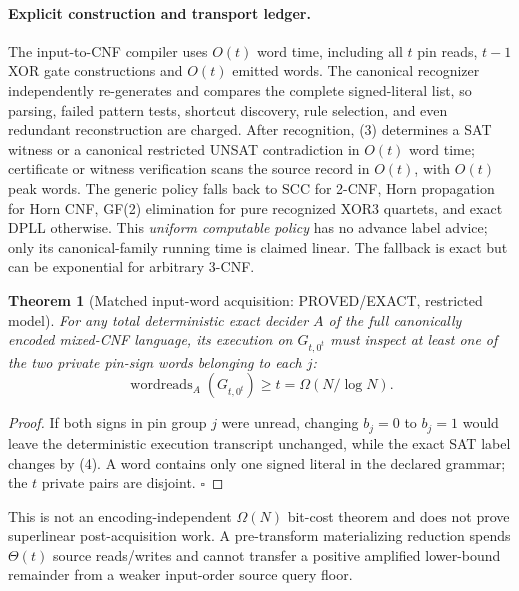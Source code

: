 \documentclass[11pt]{article}
\newtheorem{theorem}{Theorem}
\begin{document}
\paragraph{Explicit construction and transport ledger.}
The input-to-CNF compiler uses \(O(t)\) word time, including all \(t\)
pin reads, \(t-1\) XOR gate constructions and \(O(t)\) emitted words.
The canonical recognizer independently re-generates and compares the
complete signed-literal list, so parsing, failed pattern tests, shortcut
discovery, rule selection, and even redundant reconstruction are charged.
After recognition, (3) determines a SAT witness or a canonical restricted
UNSAT contradiction in \(O(t)\) word time; certificate or witness
verification scans the source record in \(O(t)\), with \(O(t)\) peak words.
The generic policy falls back to SCC for 2-CNF, Horn propagation for Horn
CNF, GF(2) elimination for pure recognized XOR3 quartets, and exact DPLL
otherwise. This \emph{uniform computable policy} has no advance label
advice; only its canonical-family running time is claimed linear.
The fallback is exact but can be exponential for arbitrary 3-CNF.

\begin{theorem}[Matched input-word acquisition: PROVED/EXACT, restricted model]
For any total deterministic exact decider \(A\) of the full canonically
encoded mixed-CNF language, its execution on \(G_{t,0^t}\) must inspect
at least one of the two private pin-sign words belonging to each \(j\):
\[
\operatorname{wordreads}_A(G_{t,0^t})\ge t
 =\Omega(N/\log N).                           \tag{11}
\]
\end{theorem}
\begin{proof}
If both signs in pin group \(j\) were unread, changing \(b_j=0\) to
\(b_j=1\) would leave the deterministic execution transcript unchanged,
while the exact SAT label changes by (4). A word contains only one signed
literal in the declared grammar; the \(t\) private pairs are disjoint.
\(\square\)
\end{proof}
This is not an encoding-independent \(\Omega(N)\) bit-cost theorem and
does not prove superlinear post-acquisition work. A pre-transform
materializing reduction spends \(\Theta(t)\) source reads/writes and cannot
transfer a positive amplified lower-bound remainder from a weaker
input-order source query floor.
\end{document}
